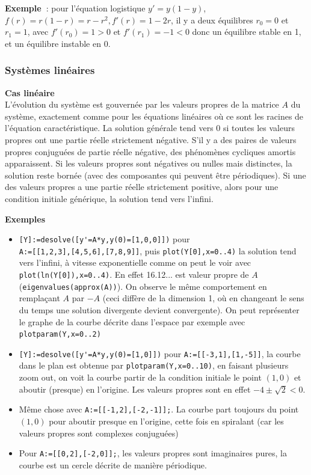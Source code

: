 \documentclass[a4paper,11pt]{article}
\begin{document}
{\bf Exemple~}: pour l'\'equation logistique $y'=y(1-y)$,
$f(r)=r(1-r)=r-r^2, f'(r)=1-2r$, 
il y a deux \'equilibres $r_0=0$ et $r_1=1$, avec $f'(r_0)=1>0$
et $f'(r_1)=-1<0$ donc un \'equilibre stable en 1, et un \'equilibre
instable en 0.

\subsubsection{Syst\`emes lin\'eaires}
{\bf Cas lin\'eaire}\\
L'\'evolution du syst\`eme est gouvern\'ee par les valeurs propres
de la matrice $A$ du syst\`eme, exactement comme pour les \'equations
lin\'eaires o\`u ce sont les racines de l'\'equation
caract\'eristique.
La solution g\'en\'erale tend vers 0 si toutes les valeurs propres
ont une partie r\'eelle strictement n\'egative. S'il y a des paires
de valeurs propres conjugu\'ees de partie r\'eelle n\'egative,
des ph\'enom\`enes cycliques amortis apparaissent.
Si les valeurs propres sont n\'egatives ou nulles mais distinctes, la solution
reste born\'ee (avec des composantes qui peuvent \^etre
p\'eriodiques).
Si une des valeurs propres a une partie r\'eelle strictement positive,
alors pour une condition initiale g\'en\'erique, la solution tend vers
l'infini.

{\bf Exemples }
\begin{itemize}
\item
\verb|[Y]:=desolve([y'=A*y,y(0)=[1,0,0]])| pour\\
\verb|A:=[[1,2,3],[4,5,6],[7,8,9]]|, 
puis \verb|plot(Y[0],x=0..4)| la solution tend vers l'infini,
\`a vitesse exponentielle comme on peut
le voir avec \verb|plot(ln(Y[0]),x=0..4)|.
En effet 16.12... est valeur propre de $A$
(\verb|eigenvalues(approx(A))|). On observe le m\^eme
comportement en rempla\c{c}ant $A$ par $-A$ (ceci
diff\`ere de la dimension 1, o\`u en changeant le sens
du temps une solution divergente devient convergente).
On peut repr\'esenter le graphe de la courbe d\'ecrite
dans l'espace par exemple avec \verb|plotparam(Y,x=0..2)|
\item \verb|[Y]:=desolve([y'=A*y,y(0)=[1,0]])| pour 
\verb|A:=[[-3,1],[1,-5]]|, la courbe dans le plan est
obtenue par \verb|plotparam(Y,x=0..10)|, en faisant
plusieurs zoom out, on voit la courbe partir de la condition
initiale le point $(1,0)$ et aboutir (presque) en l'origine.
Les valeurs propres sont en effet $-4\pm \sqrt{2}<0$.
\item M\^eme chose avec \verb|A:=[[-1,2],[-2,-1]];|.
La courbe part toujours du point $(1,0)$ pour
aboutir presque en l'origine, cette fois en spiralant
(car les valeurs propres sont complexes conjugu\'ees)
\item Pour \verb|A:=[[0,2],[-2,0]];|, les valeurs
propres sont imaginaires pures, la courbe est un cercle
d\'ecrite de mani\`ere p\'eriodique.
\end{itemize}
\end{document}
